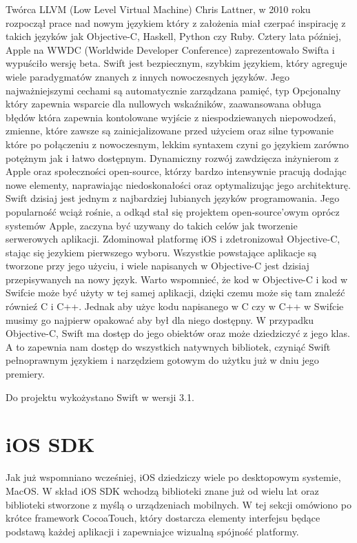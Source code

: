 Twórca LLVM (Low Level Virtual Machine) Chris Lattner, w 2010 roku rozpoczął prace nad nowym językiem który z założenia miał czerpać
inspirację z takich języków jak Objective-C, Haskell, Python czy Ruby. Cztery lata później, Apple na WWDC (Worldwide Developer
Conference) zaprezentowało Swifta i wypuściło wersję beta. Swift jest bezpiecznym, szybkim językiem, który agreguje wiele paradygmatów
znanych z innych nowoczesnych języków. Jego najważniejszymi cechami są automatycznie zarządzana pamięć, typ Opcjonalny który zapewnia
wsparcie dla nullowych wskaźników, zaawansowana obługa błędów która zapewnia kontolowane wyjście z niespodziewanych niepowodzeń, zmienne,
które zawsze są zainicjalizowane przed użyciem oraz silne typowanie które po połączeniu z nowoczesnym, lekkim syntaxem czyni go językiem
zarówno potężnym jak i łatwo dostępnym. Dynamiczny rozwój zawdzięcza inżynierom z Apple oraz społeczności open-source, którzy bardzo
intensywnie pracują dodając nowe elementy, naprawiając niedoskonałości oraz optymalizując jego architekturę. Swift dzisiaj jest jednym
z najbardziej lubianych języków programowania. Jego popularność wciąż rośnie, a odkąd stał się projektem open-source'owym oprócz
systemów Apple, zaczyna być uzywany do takich celów jak tworzenie serwerowych aplikacji. Zdominował platformę iOS i zdetronizował
Objective-C, stając się jezykiem pierwszego wyboru. Wszystkie powstające aplikacje są tworzone przy jego użyciu, i wiele napisanych w
Objective-C jest dzisiaj przepisywanych na nowy język. Warto wspomnieć, że kod w Objective-C i kod w Swifcie może być użyty w tej samej
aplikacji, dzięki czemu może się tam znaleźć równieź C i C++. Jednak aby użyc kodu napisanego w C czy w C++ w Swifcie musimy go najpierw
opakować aby był dla niego dostępny. W przypadku Objective-C, Swift ma dostęp do jego obiektów oraz może dziedziczyć z jego klas. A to
zapewnia nam dostęp do wszystkich natywnych bibliotek, czyniąć Swift pełnoprawnym językiem i narzędziem gotowym do użytku już w dniu
jego premiery.

Do projektu wykożystano Swift w wersji 3.1.

\section{iOS SDK}

Jak już wspomniano wcześniej, iOS dziedziczy wiele po desktopowym systemie, MacOS. W skład iOS SDK wchodzą biblioteki znane już od wielu
lat oraz biblioteki stworzone z myślą o urządzeniach mobilnych. W tej sekcji omówiono po krótce framework CocoaTouch, który dostarcza
elementy interfejsu będące podstawą każdej aplikacji i zapewniajce wizualną spójność platformy.

